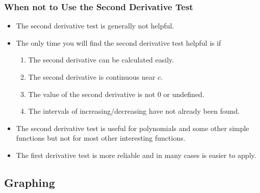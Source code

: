 \documentclass[serif,ignorenonframetext]{beamer}
\begin{document}
\begin{frame}
  \frametitle{When not to Use the Second Derivative Test}
  \begin{itemize}[<+->]
  \item The second derivative test is generally not helpful.
  \item The only time you will find the second derivative test
    helpful is if
    \begin{enumerate}[<+->]
    \item The second derivative can be calculated easily.
    \item The second derivative is continuous near $c$.
    \item The value of the second derivative is not $0$ or undefined.
    \item The intervals of increasing/decreasing have not already been
      found.
    \end{enumerate}
  \item The second derivative test is useful for polynomials and some
    other simple functions but not for most other interesting functions.
  \item The first derivative test is more reliable and in many cases
    is easier to apply.
  \end{itemize}
\end{frame}


\subsection{Graphing}
\end{document}
